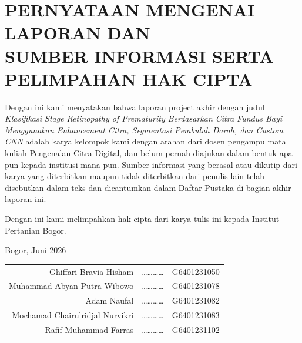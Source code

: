 
\chapter*{PERNYATAAN MENGENAI LAPORAN DAN\\
SUMBER INFORMASI SERTA PELIMPAHAN HAK CIPTA}
\thispagestyle{empty}

Dengan ini kami menyatakan bahwa laporan project akhir dengan judul
\textit{Klasifikasi Stage Retinopathy of Prematurity Berdasarkan Citra Fundus Bayi
Menggunakan Enhancement Citra, Segmentasi Pembuluh Darah, dan Custom CNN}
adalah karya kelompok kami dengan arahan dari dosen pengampu mata kuliah
Pengenalan Citra Digital, dan belum pernah diajukan dalam bentuk apa pun kepada
institusi mana pun.
Sumber informasi yang berasal atau dikutip dari karya yang diterbitkan maupun
tidak diterbitkan dari penulis lain telah disebutkan dalam teks dan dicantumkan
dalam Daftar Pustaka di bagian akhir laporan ini.

Dengan ini kami melimpahkan hak cipta dari karya tulis ini kepada Institut
Pertanian Bogor.

\vspace{1.5cm}

\begin{flushright}
Bogor, Juni 2026\\[1.5cm]
\begin{tabular}{r c l}
Ghiffari Bravia Hisham          & \ldots\ldots\ldots\ldots & G6401231050 \\[0.5cm]
Muhammad Abyan Putra Wibowo     & \ldots\ldots\ldots\ldots & G6401231078 \\[0.5cm]
Adam Naufal                     & \ldots\ldots\ldots\ldots & G6401231082 \\[0.5cm]
Mochamad Chairulridjal Nurvikri & \ldots\ldots\ldots\ldots & G6401231083 \\[0.5cm]
Rafif Muhammad Farras           & \ldots\ldots\ldots\ldots & G6401231102 \\
\end{tabular}
\end{flushright}
